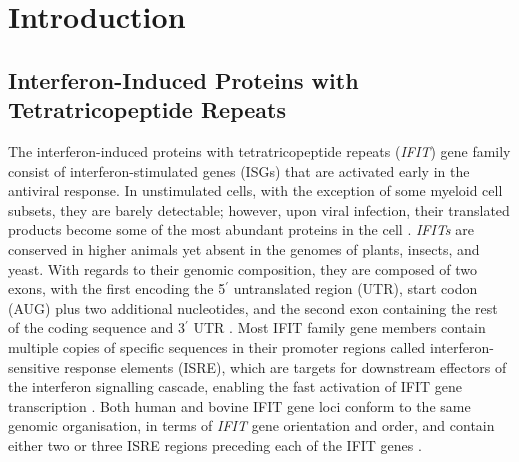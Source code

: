 \chapter{Introduction} \label{ch:Introduction}
\section{Interferon-Induced Proteins with Tetratricopeptide Repeats} \label{sec:Interferon-Induced Proteins with Tetratricopeptide Repeats}
The interferon-induced proteins with tetratricopeptide repeats (\textit{IFIT}) gene family consist of interferon-stimulated genes (ISGs) that are activated early in the antiviral response. In unstimulated cells, with the exception of some myeloid cell subsets, they are barely detectable; however, upon viral infection, their translated products become some of the most abundant proteins in the cell \cite{Diamond2013TheProteins}. \textit{IFITs} are conserved in higher animals yet absent in the genomes of plants, insects, and yeast. With regards to their genomic composition, they are composed of two exons, with the first encoding the 5$^{\prime}$ untranslated region (UTR), start codon (AUG) plus two additional nucleotides, and the second exon containing the rest of the coding sequence and 3$^{\prime}$ UTR \cite{deVeer1998IFI60/ISG60/IFIT4Genes}. Most IFIT family gene members contain multiple copies of specific sequences in their promoter regions called interferon-sensitive response elements (ISRE), which are targets for downstream effectors of the interferon signalling cascade, enabling the fast activation of IFIT gene transcription \cite{Lou2009IFR-9/STAT2STAT1}. Both human and bovine IFIT gene loci conform to the same genomic organisation, in terms of \textit{IFIT} gene orientation and order, and contain either two or three ISRE regions preceding each of the IFIT genes \cite{Liu2013Lineage-SpecificFamily}.

